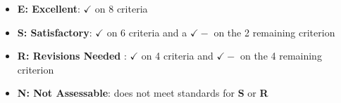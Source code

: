 \documentclass[12pt]{article}
\begin{document}

\begin{itemize}
\item \textbf{E: Excellent}: $\checkmark$ on 8 criteria
\item \textbf{S: Satisfactory}: $\checkmark$ on 6 criteria and a $\checkmark\!-$ on the 2 remaining criterion
\item \textbf{R: Revisions Needed }: $\checkmark$ on 4 criteria and $\checkmark\!-$ on the 4 remaining criterion
\item \textbf{N: Not Assessable}: does not meet standards for \textbf{S} or \textbf{R}
\end{itemize}
\end{document}
